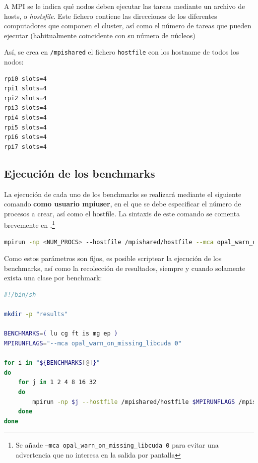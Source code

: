 A MPI se le indica qué nodos deben ejecutar las tareas mediante un archivo de hosts, o \textit{hostsfile}\cite{mpi_hostfile_option}. Este fichero contiene las direcciones de los diferentes computadores que componen el cluster, así como el número de tareas que pueden ejecutar (habitualmente coincidente con su número de núcleos)

Así, se crea en \texttt{/mpishared} el fichero \texttt{hostfile} con los hostname de todos los nodos:

\begin{lstlisting}[language=bash]
rpi0 slots=4
rpi1 slots=4
rpi2 slots=4
rpi3 slots=4
rpi4 slots=4
rpi5 slots=4
rpi6 slots=4
rpi7 slots=4
\end{lstlisting}

\subsection{Ejecución de los benchmarks}
La ejecución de cada uno de los benchmarks se realizará mediante el siguiente comando \textbf{como usuario mpiuser}, en el que se debe especificar el número de procesos a crear, así como el hostfile. La sintaxis de este comando se comenta brevemente en .\footnote{Se añade \texttt{--mca opal\_warn\_on\_missing\_libcuda 0} para evitar una advertencia que no interesa en la salida por pantalla}

\begin{lstlisting}[language=bash]
mpirun -np <NUM_PROCS> --hostfile /mpishared/hostfile --mca opal_warn_on_missing_libcuda 0 /mpishared/NPB3.4.2/NPB3.4-MPI/bin/<KERNEL>.<CLASS>.x
\end{lstlisting}

Como estos parámetros son fijos, es posible scriptear la ejecución de los benchmarks, así como la recolección de resultados, siempre y cuando solamente exista una clase por benchmark:

\begin{lstlisting}[language=bash]
#!/bin/sh

mkdir -p "results"

BENCHMARKS=( lu cg ft is mg ep )
MPIRUNFLAGS="--mca opal_warn_on_missing_libcuda 0"

for i in "${BENCHMARKS[@]}"
do
    for j in 1 2 4 8 16 32
    do
        mpirun -np $j --hostfile /mpishared/hostfile $MPIRUNFLAGS /mpishared/NPB3.4.2/NPB3.4-MPI/bin/${i}.*.x | tee -a results/$i.$j.run
    done
done
\end{lstlisting}

